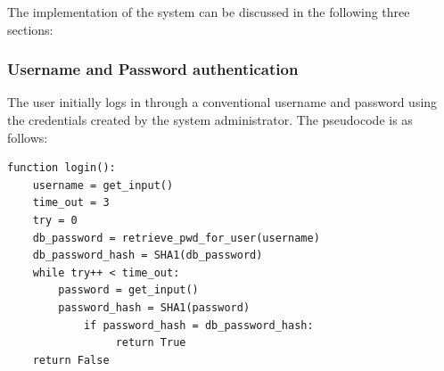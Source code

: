 \documentclass[12pt]{article}			%
\begin{document}
The implementation of the system can be discussed in the following three sections:

\subsubsection{ Username and Password authentication }

The user initially logs in through a conventional username and password using the credentials created by the system administrator. The pseudocode is as follows:

\begin{verbatim}
function login():
    username = get_input()
    time_out = 3
    try = 0
    db_password = retrieve_pwd_for_user(username)
    db_password_hash = SHA1(db_password)
    while try++ < time_out:
        password = get_input()
        password_hash = SHA1(password)
            if password_hash = db_password_hash:
                 return True
    return False
\end{verbatim}


\begin{figure}
	\centering
	\quad
\end{figure}
\end{document}
